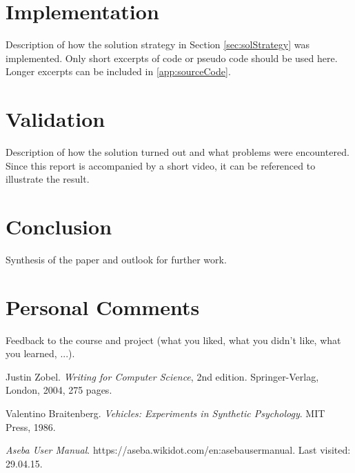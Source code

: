 \documentclass[12pt,a4paper]{article}
\begin{document}
\section{Implementation}
Description of how the solution strategy in Section \ref{sec:solStrategy} was implemented. Only short excerpts of code or pseudo code should be used here. Longer excerpts can be included in \ref{app:sourceCode}.

\section{Validation}
Description of how the solution turned out and what problems were encountered. Since this report is accompanied by a short video, it can be referenced to illustrate the result.

\section*{Conclusion}
Synthesis of the paper and outlook for further work.

\section*{Personal Comments}
Feedback to the course and project (what you liked, what you didn't like, what you learned, ...).

\begin{thebibliography}{20}
Justin Zobel.											%
\textit{Writing for Computer Science}, 2nd edition.		%
Springer-Verlag, London, 2004, 275 pages.				%

Valentino Braitenberg.									%
\textit{Vehicles: Experiments in Synthetic Psychology}.	%
MIT Press, 1986.										%

\textit{Aseba User Manual}.										%
https://aseba.wikidot.com/en:asebausermanual.			%
Last visited: 29.04.15.									%
\end{thebibliography}
\appendix
\renewcommand{\thesection}{Appendix \Alph{section}}
\renewcommand{\thesubsection}{\Alph{section}.\arabic{subsection}}
\end{document}
